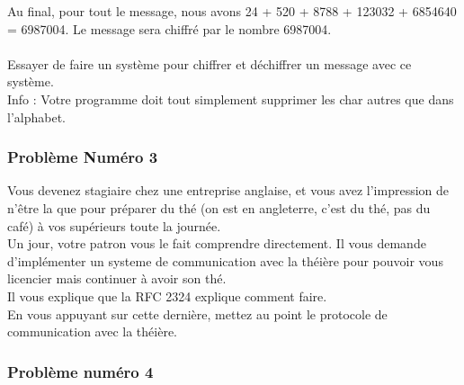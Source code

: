 \documentclass[12pt]{article}
\begin{document}
Au final, pour tout le message, nous avons 24 + 520 + 8788 + 123032 + 6854640 = 6987004. Le message sera chiffré par le nombre 6987004.
\\\\
Essayer de faire un système pour chiffrer et déchiffrer un message avec ce système.\\
Info : Votre programme doit tout simplement supprimer les char autres que dans l'alphabet.

\subsubsection{Problème Numéro 3}

Vous devenez stagiaire chez une entreprise anglaise, et vous avez l'impression de n'être la que pour préparer du thé (on est en angleterre, c'est du thé, pas du café) à vos supérieurs toute la journée.\\
Un jour, votre patron vous le fait comprendre directement. Il vous demande d'implémenter un systeme de communication avec la théière pour pouvoir vous licencier mais continuer à avoir son thé.\\
Il vous explique que la RFC 2324 explique comment faire.\\
En vous appuyant sur cette dernière, mettez au point le protocole de communication avec la théière.

\subsubsection{Problème numéro 4}
\end{document}

